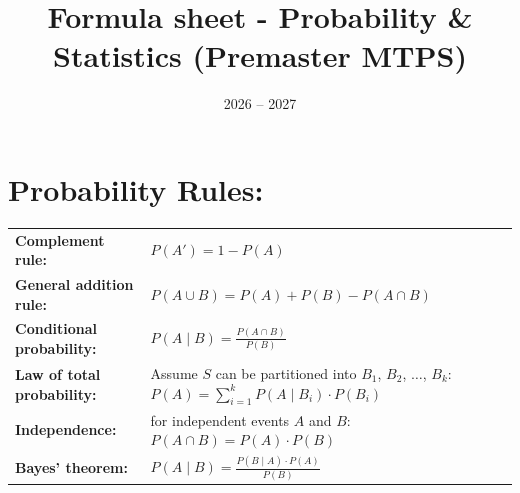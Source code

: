 \documentclass[11pt,a4paper,english]{article} %
\title{Formula sheet - Probability \& Statistics (Premaster MTPS)}
\author{2026 -- 2027}
\date{}
\begin{document}
\maketitle
\section*{Probability Rules:}
\begin{center}
    \renewcommand{\arraystretch}{1.5}
    \begin{tabular}{lm{}}
        \toprule
            \textbf{Complement rule:} & $P(A') = 1 - P(A)$ \\
            \textbf{General addition rule:} & $P(A \cup B) = P(A) + P(B) - P(A \cap B)$ \\
            \textbf{Conditional probability:} & $P(A \mid B) = \frac{P(A \cap B)}{P(B)}$ \\
            \textbf{Law of total probability:} & Assume $S$ can be partitioned into $B_1$, $B_2$, $\ldots$, $B_k$: \newline
            $P(A) = \sum_{i=1}^k P(A \mid B_i) \cdot P(B_i)$ \\
            \textbf{Independence:} & for independent events $A$ and $B$: $P(A \cap B) = P(A) \cdot P(B)$\\
            \textbf{Bayes' theorem:} & $P(A \mid B) = \frac{P(B \mid A) \cdot P(A)}{P(B)}$ \\
        \bottomrule
    \end{tabular}
\end{center}
\end{document}
